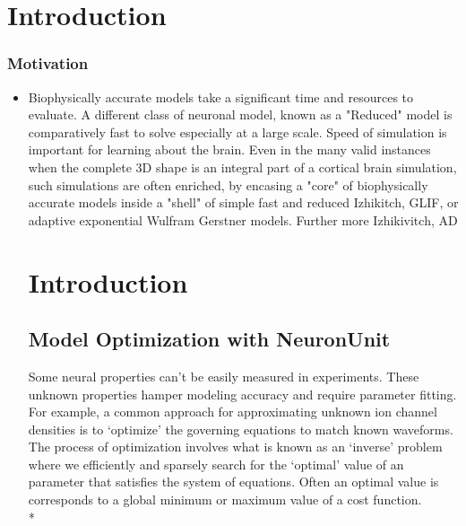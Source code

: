 
\section{Introduction}

\subsubsection{Motivation}
\begin{itemize}
Need to explain two things:
- why optimize, but also why reduced models. Probably why models first.

\item Biophysically accurate models take a significant time and resources to evaluate. A different class of neuronal model, known as a "Reduced" model is comparatively fast to solve especially at a large scale. Speed of simulation is important for learning about the brain. Even in the many valid instances when the complete 3D shape is an integral part of a cortical brain simulation, such simulations are often enriched, by encasing a "core" of biophysically accurate models inside a "shell" of simple fast and reduced Izhikitch, GLIF, or adaptive exponential \cite{brette2005adaptive} Wulfram Gerstner models. Further more Izhikivitch, AD

\section{Introduction}

\subsection{Model  Optimization with NeuronUnit}
Some neural properties can’t be easily measured in experiments. These unknown properties hamper modeling accuracy and require parameter fitting. For example, a common approach for approximating unknown ion channel densities is to ‘optimize’ the governing equations to match known waveforms. The process of optimization involves what is known as an ‘inverse’ problem where we efficiently and sparsely search for the ‘optimal’ value of an parameter that satisfies the system of equations. Often an optimal value is corresponds to a global minimum or maximum value of a cost function.\\*


\end{itemize}
